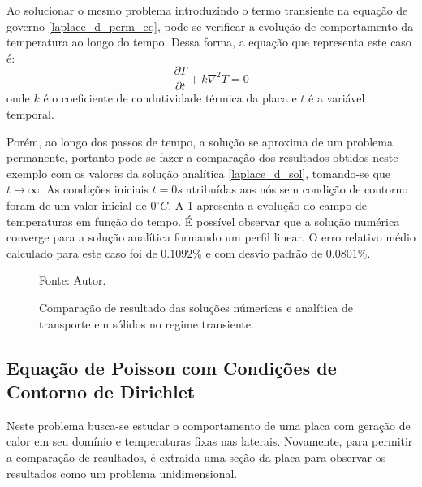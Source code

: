 Ao solucionar o mesmo problema introduzindo o termo transiente na equação de governo \ref{laplace_d_perm_eq}, pode-se verificar a evolução de comportamento da temperatura ao longo do tempo.
Dessa forma, a equação que representa este caso é:
\begin{equation}
    \dfrac{\partial T}{\partial t} + k\nabla^2 T = 0
    \label{laplace_d_trans_eq} 
\end{equation}
onde $k$ é o coeficiente de condutividade térmica da placa e $t$ é a variável temporal.

Porém, ao longo dos passos de tempo, a solução se aproxima de um problema permanente, portanto pode-se fazer a comparação dos resultados obtidos neste exemplo com os valores da solução analítica \eqref{laplace_d_sol}, tomando-se que $t\rightarrow \infty$.
As condições iniciais $t=0s$ atribuídas aos nós sem condição de contorno foram de um valor inicial de $0^{\circ}C$.
A \ref{laplace_d_trans_comp} apresenta a evolução do campo de temperaturas em função do tempo.
É possível observar que a solução numérica converge para a solução analítica formando um perfil linear.
O erro relativo médio calculado para este caso foi de $0.1092\%$ e com desvio padrão de $0.0801\%$.
\begin{figure}[H]
    \centering
     {\raggedleft \scriptsize Fonte: Autor.}
    \caption{Comparação de resultado das soluções númericas e analítica de transporte em sólidos no regime transiente.}
    \label{laplace_d_trans_comp}
\end{figure}


\subsection{\textbf{Equação de Poisson com Condições de Contorno de Dirichlet}}
\label{sec_poisson_dir}
Neste problema busca-se estudar o comportamento de uma placa com geração de calor em seu domínio e temperaturas fixas nas laterais.
Novamente, para permitir a comparação de resultados, é extraída uma seção da placa para observar os resultados como um problema unidimensional.

